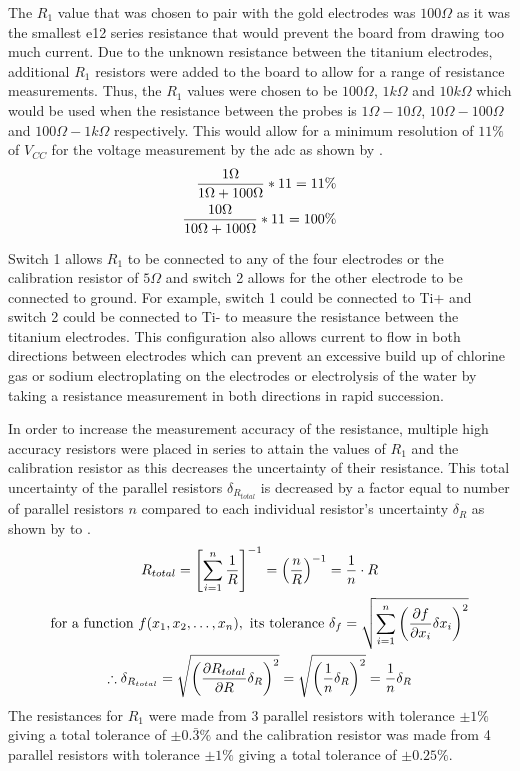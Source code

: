 The $R_1$ value that was chosen to pair with the gold electrodes was $100\Omega$ as it was the smallest e12 series resistance that would prevent the board from drawing too much current.
Due to the unknown resistance between the titanium electrodes, additional $R_1$ resistors were added to the board to allow for a range of resistance measurements.
Thus, the $R_1$ values were chosen to be $100\Omega$, $1k\Omega$ and $10k\Omega$ which would be used when the resistance between the probes is $1\Omega - 10\Omega$, $10\Omega - 100\Omega$ and $100\Omega - 1k\Omega$ respectively.
This would allow for a minimum resolution of $11\%$ of $V_{CC}$ for the voltage measurement by the \gls{adc} as shown by .
\begin{align}\label{eqn:adc-resolution}
    \frac{\displaystyle 1\Omega}{\displaystyle 1\Omega + 100\Omega} * 11 = 11\% \\
    \frac{\displaystyle 10\Omega}{\displaystyle 10\Omega + 100\Omega} * 11 = 100\%
\end{align} 

Switch 1 allows $R_1$ to be connected to any of the four electrodes or the calibration resistor of $5\Omega$ and switch 2 allows for the other electrode to be connected to ground.
For example, switch 1 could be connected to Ti+ and switch 2 could be connected to Ti- to measure the resistance between the titanium electrodes.
This configuration also allows current to flow in both directions between electrodes which can prevent an excessive build up of chlorine gas or sodium electroplating on the electrodes or electrolysis of the water by taking a resistance measurement in both directions in rapid succession.

In order to increase the measurement accuracy of the resistance, multiple high accuracy resistors were placed in series to attain the values of $R_1$ and the calibration resistor as this decreases the uncertainty of their resistance.
This total uncertainty of the parallel resistors $\delta_{R_{total}}$ is decreased by a factor equal to number of parallel resistors $n$ compared to each individual resistor's uncertainty $\delta_R$ as shown by  to .
\begin{gather}
    R_{total} = {\left[ \sum_{i=1}^{n} \frac{\displaystyle 1}{\displaystyle R} \right]}^{-1} = {\left(\frac{\displaystyle n}{\displaystyle R}\right)}^{-1} = \frac{\displaystyle 1}{\displaystyle n}\cdot R \label{eqn:parallel-resistor-total} \\
    \text{for a function}~f(x_1,x_2,\dots,x_n),~\text{its tolerance} ~\delta_f = \sqrt{\sum_{i=1}^{n} {\left( \frac{\displaystyle \partial f}{\displaystyle \partial x_i} \delta x_i \right)}^2} \label{eqn:uncertainty-general-formula} \\
    \therefore \delta_{R_{total}} = \sqrt{{\left( \frac{\displaystyle \partial R_{total}}{\displaystyle \partial R} \delta_R \right)}^2} = \sqrt{{\left( \frac{\displaystyle 1}{\displaystyle n} \delta_R \right)}^2} = \frac{\displaystyle 1}{\displaystyle n} \delta_R \label{eqn:parallel-resistor-uncertainty}
\end{gather}
The resistances for $R_1$ were made from 3 parallel resistors with tolerance $\pm1\%$ giving a total tolerance of $\pm0.\bar{3}\%$ and the calibration resistor was made from 4 parallel resistors with tolerance $\pm1\%$ giving a total tolerance of $\pm0.25\%$.

